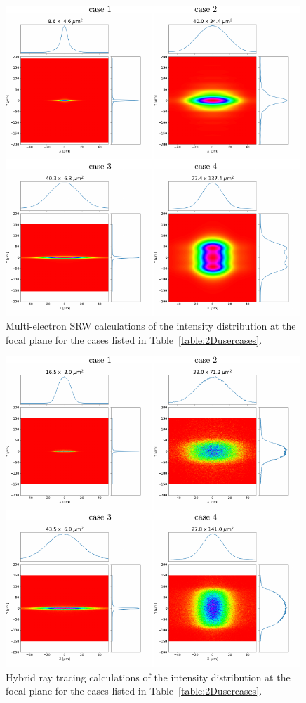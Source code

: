 \documentclass{iucr}              %
\begin{document}
\begin{figure}\label{fig:srw}
    \includegraphics[width=0.99\textwidth]{figures/fig_srw.pdf}
    \caption{Multi-electron SRW calculations of the intensity distribution at the focal plane for the cases listed in Table~\ref{table:2Dusercases}.}
\end{figure}

\vspace{1cm}

\begin{figure}
    \label{fig:hybrid}
    \includegraphics[width=0.99\textwidth]{figures/fig_hybrid.pdf}
    \caption{Hybrid ray tracing calculations of the intensity distribution at the focal plane for the cases listed in Table~\ref{table:2Dusercases}.}
\end{figure}
\end{document}
